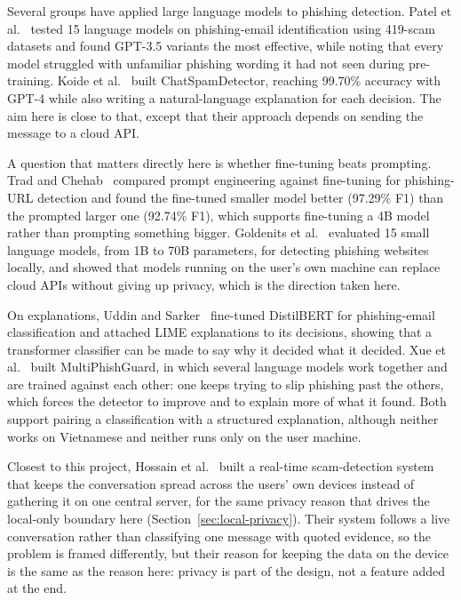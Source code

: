 Several groups have applied large language models to phishing detection. Patel et al.~\cite{patel2024evaluating} tested 15 language models on phishing-email identification using 419-scam datasets and found GPT-3.5 variants the most effective, while noting that every model struggled with unfamiliar phishing wording it had not seen during pre-training. Koide et al.~\cite{koide2024chatspamdetector} built ChatSpamDetector, reaching 99.70\% accuracy with GPT-4 while also writing a natural-language explanation for each decision. The aim here is close to that, except that their approach depends on sending the message to a cloud API.

A question that matters directly here is whether fine-tuning beats prompting. Trad and Chehab~\cite{trad2024prompt} compared prompt engineering against fine-tuning for phishing-URL detection and found the fine-tuned smaller model better (97.29\% F1) than the prompted larger one (92.74\% F1), which supports fine-tuning a 4B model rather than prompting something bigger. Goldenits et al.~\cite{goldenits2026small} evaluated 15 small language models, from 1B to 70B parameters, for detecting phishing websites locally, and showed that models running on the user's own machine can replace cloud APIs without giving up privacy, which is the direction taken here.

On explanations, Uddin and Sarker~\cite{uddin2024explainable} fine-tuned DistilBERT for phishing-email classification and attached LIME explanations to its decisions, showing that a transformer classifier can be made to say why it decided what it decided. Xue et al.~\cite{xue2025multiphishguard} built MultiPhishGuard, in which several language models work together and are trained against each other: one keeps trying to slip phishing past the others, which forces the detector to improve and to explain more of what it found. Both support pairing a classification with a structured explanation, although neither works on Vietnamese and neither runs only on the user machine.

Closest to this project, Hossain et al.~\cite{hossain2025scambaiting} built a real-time scam-detection system that keeps the conversation spread across the users' own devices instead of gathering it on one central server, for the same privacy reason that drives the local-only boundary here (Section~\ref{sec:local-privacy}). Their system follows a live conversation rather than classifying one message with quoted evidence, so the problem is framed differently, but their reason for keeping the data on the device is the same as the reason here: privacy is part of the design, not a feature added at the end.

